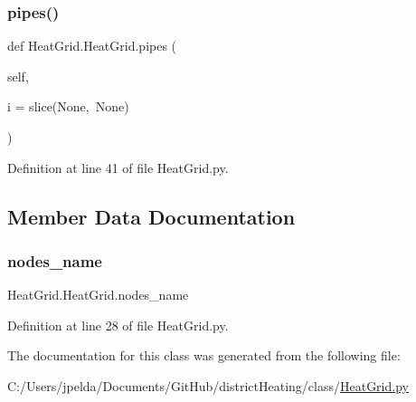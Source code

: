 \subsubsection{\texorpdfstring{pipes()}{pipes()}}
{\footnotesize\ttfamily def Heat\+Grid.\+Heat\+Grid.\+pipes (\begin{DoxyParamCaption}\item[{}]{self,  }\item[{}]{i = {\ttfamily slice(None,~None)} }\end{DoxyParamCaption})}



Definition at line 41 of file Heat\+Grid.\+py.



\subsection{Member Data Documentation}
\mbox{\label{class_heat_grid_1_1_heat_grid_a3611b66c8dfdfdd3e94db12e76cfe9b7}} 
\subsubsection{\texorpdfstring{nodes\+\_\+name}{nodes\_name}}
{\footnotesize\ttfamily Heat\+Grid.\+Heat\+Grid.\+nodes\+\_\+name}



Definition at line 28 of file Heat\+Grid.\+py.



The documentation for this class was generated from the following file\+:\begin{DoxyCompactItemize}
\item 
C\+:/\+Users/jpelda/\+Documents/\+Git\+Hub/district\+Heating/class/\hyperlink{_heat_grid_8py}{Heat\+Grid.\+py}\end{DoxyCompactItemize}

